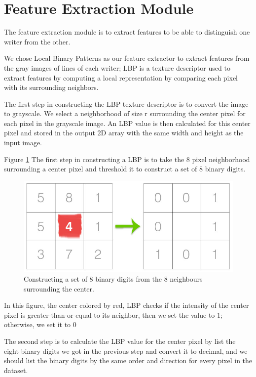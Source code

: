 \section{Feature Extraction Module}
The feature extraction module is to extract features to be able to distinguish one writer from the other.

We chose Local Binary Patterns as our feature extractor to extract features from the gray images of lines of each writer; LBP is a texture descriptor used to extract features by computing a local representation by comparing each pixel with its surrounding neighbors.

The first step in constructing the LBP texture descriptor is to convert the image to grayscale. We select a neighborhood of size r surrounding the center pixel for each pixel in the grayscale image. An LBP value is then calculated for this center pixel and stored in the output 2D array with the same width and height as the input image.

Figure \ref{fig:lbp_thresholding} The first step in constructing a LBP is to take the 8 pixel neighborhood surrounding a center pixel and threshold it to construct a set of 8 binary digits.

\begin{figure}
    \centering
    \includegraphics[width=0.9\linewidth]{../figures/lbp_thresholding.jpg}
    \caption{Constructing a set of 8 binary digits from the 8 neighbours surrounding the center.}
    \label{fig:lbp_thresholding}
\end{figure}

In this figure, the center colored by red, LBP checks if the intensity of the center pixel is greater-than-or-equal to its neighbor, then we set the value to 1; otherwise, we set it to 0

The second step is to calculate the LBP value for the center pixel by list the eight binary digits we got in the previous step and convert it to decimal, and we should list the binary digits by the same order and direction for every pixel in the dataset.

